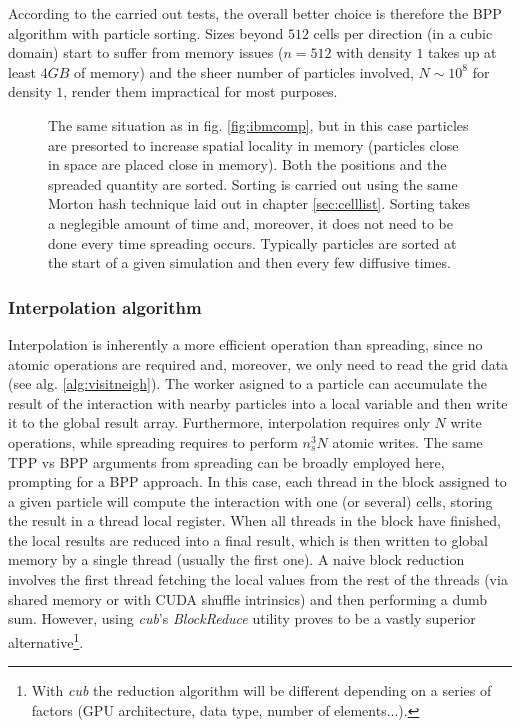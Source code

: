 \documentclass[ twoside,openright,titlepage,numbers=noenddot,%
headinclude,footinclude,cleardoublepage=empty,abstract=on,
BCOR=5mm,paper=a4,fontsize=11pt, dvipsnames
]{scrreprt}
\begin{document}
According to the carried out tests, the overall better choice is therefore the BPP algorithm with particle sorting.
Sizes beyond $512$ cells per direction (in a cubic domain) start to suffer from memory issues ($n=512$ with density $1$ takes up at least $4GB$ of memory) and the sheer number of particles involved, $N\sim 10^8$ for density $1$, render them impractical for most purposes.
\begin{figure}[h]
  \centering
\caption{The same situation as in fig. \ref{fig:ibmcomp}, but in this case particles are presorted to increase spatial locality in memory (particles close in space are placed close in memory). Both the positions and the spreaded quantity are sorted. Sorting is carried out using the same Morton hash technique laid out in chapter \ref{sec:celllist}. Sorting takes a neglegible amount of time and, moreover, it does not need to be done every time spreading occurs. Typically particles are sorted at the start of a given simulation and then every few diffusive times.}
\label{fig:ibmcompsorted}
\end{figure}


\subsubsection*{Interpolation algorithm}
Interpolation is inherently a more efficient operation than spreading, since no atomic operations are required and, moreover, we only need to read the grid data (see alg. \ref{alg:visitneigh}). The worker asigned to a particle can accumulate the result of the interaction with nearby particles into a local variable and then write it to the global result array. Furthermore, interpolation requires only $N$ write operations, while spreading requires to perform $n_s^3N$ atomic writes.
The same TPP vs BPP arguments from spreading can be broadly employed here, prompting for a BPP approach. In this case, each thread in the block assigned to a given particle will compute the interaction with one (or several) cells, storing the result in a thread local register.
When all threads in the block have finished, the local results are reduced into a final result, which is then written to global memory by a single thread (usually the first one).
A naive block reduction involves the first thread fetching the local values from the rest of the threads (via shared memory or with CUDA shuffle intrinsics) and then performing a dumb sum. However, using \emph{cub}'s\cite{cub} \emph{BlockReduce} utility proves to be a vastly superior alternative\footnote{With \emph{cub} the reduction algorithm will be different depending on a series of factors (GPU architecture, data type, number of elements...).}.
\end{document}
